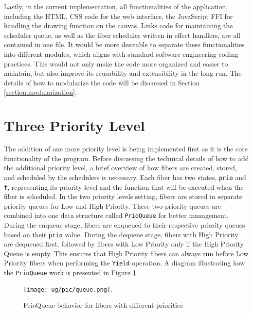 \documentclass[logo,bsc,singlespacing,parskip]{infthesis}
\begin{document}
Lastly, in the current implementation, all functionalities of the application, including the HTML, CSS code for the web interface, the JavaScript FFI for handling the drawing function on the canvas, Links code for maintaining the scheduler queue, as well as the fiber scheduler written in effect handlers, are all contained in one file. It would be more desirable to separate these functionalities into different modules, which aligns with standard software engineering coding practices. This would not only make the code more organized and easier to maintain, but also improve its reusability and extensibility in the long run. The details of how to modularize the code will be discussed in Section \ref{section:modularization}.

\section{Three Priority Level}
\label{section:queue}

The addition of one more priority level is being implemented first as it is the core functionality of the program. Before discussing the technical details of how to add the additional priority level, a brief overview of how fibers are created, stored, and scheduled by the schedulers is necessary. Each fiber has two states, \texttt{prio} and \texttt{f}, representing its priority level and the function that will be executed when the fiber is scheduled. In the two priority levels setting, fibers are stored in separate priority queues for Low and High Priority. These two priority queues are combined into one data structure called \texttt{PrioQueue} for better management. During the enqueue stage, fibers are enqueued to their respective priority queues based on their \texttt{prio} value. During the dequeue stage, fibers with High Priority are dequeued first, followed by fibers with Low Priority only if the High Priority Queue is empty. This ensures that High Priority fibers can always run before Low Priority fibers when performing the \texttt{Yield} operation. A diagram illustrating how the \texttt{PrioQueue} work is presented in Figure \ref{fig:queue}.

\begin{figure}[htbp]
    \centering
    \texttt{[image: ug/pic/queue.png]}.
    \caption{PrioQueue behavior for fibers with different priorities}
    \label{fig:queue}
\end{figure}
\end{document}
